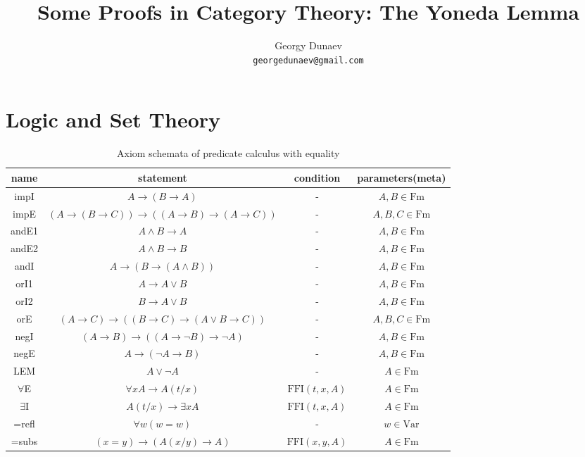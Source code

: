 \documentclass[10pt,a4paper]{article}
\title{Some Proofs in Category Theory: The Yoneda Lemma}
\author{Georgy Dunaev \\ \texttt{georgedunaev@gmail.com}}
\date{}
\begin{document}
\sloppy
\maketitle
\section{Logic and Set Theory}
\begin{table}[H]
\centering
\setlength{\tabcolsep}{4.5pt}
\caption{Axiom schemata of predicate calculus with equality}
\label{tab:axiompltab}
\begin{tabular}{|c|c|c|c|}
\hline
name & statement & condition & parameters(meta)\\ \hline
\hline
impI & $A \to (B \to A)$ & - & $A,B \in \textrm{Fm}$\\ %
impE & $(A \to (B \to C))\to((A\to B)\to(A\to C))$ & -& $A,B,C \in \textrm{Fm}$\\ \hline
\hline
andE1 & $A \land B \to A$& -& $A,B \in \textrm{Fm}$\\ %
andE2 & $A \land B \to B$& -& $A,B \in \textrm{Fm}$\\ %
andI & $A\to(B\to (A \land B))$& -& $A,B \in \textrm{Fm}$\\ \hline
\hline
orI1 & $A \to  A \lor B$& -& $A,B \in \textrm{Fm}$\\ %
orI2 & $B \to  A \lor B$& -& $A,B \in \textrm{Fm}$\\ %
orE & $(A \to  C)\to ((B \to  C) \to  (A \lor B \to  C))$& -& $A,B,C \in \textrm{Fm}$\\ \hline
\hline
negI & $(A \to  B) \to  ((A \to  \neg B) \to  \neg A)$& -& $A,B \in \textrm{Fm}$\\ %
negE & $A \to  (\neg A \to  B)$& -& $A,B \in \textrm{Fm}$\\ \hline
\hline
LEM & $A \lor \neg A$& -& $A \in \textrm{Fm}$\\ \hline
\hline
$\forall$E & $\forall xA\to A(t/x)$ & $\textrm{FFI}(t,x,A)$& $A \in \textrm{Fm}$\\ %
$\exists$I & $A(t/x)\to \exists x A$ & $\textrm{FFI}(t,x,A)$& $A \in \textrm{Fm}$\\ \hline
\hline
=refl&$\forall w (w=w)$&-& $w \in \textrm{Var}$\\
=subs&$(x=y)\to ( A(x/y)\to A) $&$\textrm{FFI}(x,y,A)$& $A \in \textrm{Fm}$\\\hline
\end{tabular}
\end{table}
\end{document}
